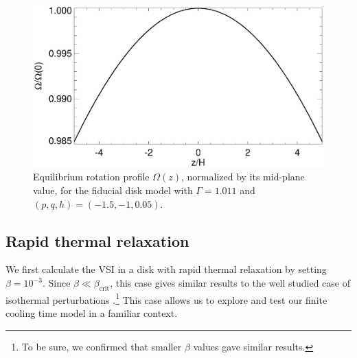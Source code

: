 \begin{figure}
  \includegraphics[width=\linewidth,clip=true,trim=0cm 0cm 0cm
  0cm]{figures/omega2} 
  \caption{Equilibrium rotation profile $\Omega(z)$,
    normalized by its mid-plane value, for  the fiducial disk model with $\Gamma=1.011$
    and $(p,q, h)=(-1.5,-1,0.05)$. 
    \label{omega_z} 
  }
\end{figure}

\subsection{Rapid thermal relaxation}\label{vertiso_pertiso} 
We first calculate the VSI in a disk with rapid thermal relaxation by
setting $\beta=10^{-3}$.  Since $\beta \ll \beta_\mathrm{crit}$, this case
gives similar results to the well studied case of isothermal perturbations
 .\footnote{To be sure, we confirmed that smaller
 $\beta$ values gave similar results.} This case allows us to explore and test our
finite cooling time model in a familiar context.



